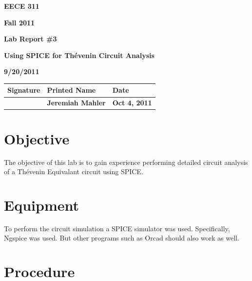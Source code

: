 \documentclass{article}
\begin{document}


\centerline{\bf EECE 311}
\centerline{\bf Fall 2011}
\centerline{\bf}
\centerline{\bf Lab Report \#3}
\centerline{\bf Using SPICE for Th\'{e}venin Circuit Analysis}
\centerline{\bf 9/20/2011}  %

\begin{center}
\begin{tabularx}{\textwidth}[b]{X l l}
Signature & Printed Name & Date \\
\hline
\multicolumn{1}{|X|}{} & \multicolumn{1}{|l|}{\bigstrut \bf Jeremiah Mahler} & \multicolumn{1}{|l|}{\bf Oct 4, 2011} \\
\hline
\end{tabularx}
\end{center}


\section{Objective}

The objective of this lab is to gain experience performing detailed
circuit analysis of a
Th\'{e}venin Equivalant \cite[Pg. 119]{nilsson2008electric} circuit
using SPICE.


\section{Equipment}

To perform the circuit simulation a SPICE\cite{wiki:SPICE} simulator was used.
Specifically, Ngspice\cite{NGSPICE} was used.
But other programs such as Orcad\cite{ORCAD} should also work as well.


\section{Procedure}
\end{document}
